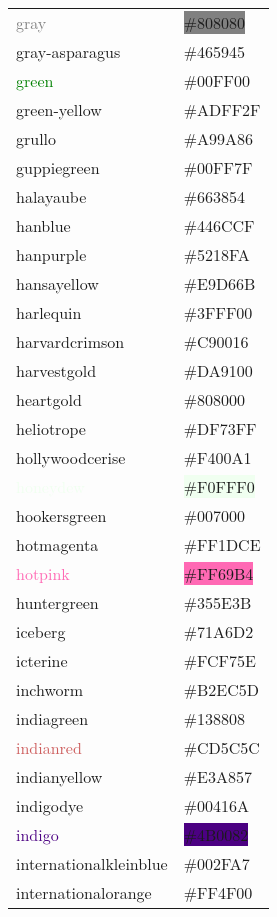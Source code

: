 \documentclass[
]{article}
\begin{document}
\begin{longtable}[]{@{}ll@{}}
\textcolor{gray}{gray} & \colorbox{gray}{\#808080}\tabularnewline
\textcolor{gray-asparagus}{gray-asparagus} &
\colorbox{gray-asparagus}{\#465945}\tabularnewline
\textcolor{green}{green} &
\colorbox{electricgreen}{\#00FF00}\tabularnewline
\textcolor{green-yellow}{green-yellow} &
\colorbox{green-yellow}{\#ADFF2F}\tabularnewline
\textcolor{grullo}{grullo} & \colorbox{grullo}{\#A99A86}\tabularnewline
\textcolor{guppiegreen}{guppiegreen} &
\colorbox{guppiegreen}{\#00FF7F}\tabularnewline
\textcolor{halayaube}{halayaube} &
\colorbox{halayaube}{\#663854}\tabularnewline
\textcolor{hanblue}{hanblue} &
\colorbox{hanblue}{\#446CCF}\tabularnewline
\textcolor{hanpurple}{hanpurple} &
\colorbox{hanpurple}{\#5218FA}\tabularnewline
\textcolor{hansayellow}{hansayellow} &
\colorbox{arylideyellow}{\#E9D66B}\tabularnewline
\textcolor{harlequin}{harlequin} &
\colorbox{harlequin}{\#3FFF00}\tabularnewline
\textcolor{harvardcrimson}{harvardcrimson} &
\colorbox{harvardcrimson}{\#C90016}\tabularnewline
\textcolor{harvestgold}{harvestgold} &
\colorbox{harvestgold}{\#DA9100}\tabularnewline
\textcolor{heartgold}{heartgold} &
\colorbox{heartgold}{\#808000}\tabularnewline
\textcolor{heliotrope}{heliotrope} &
\colorbox{heliotrope}{\#DF73FF}\tabularnewline
\textcolor{hollywoodcerise}{hollywoodcerise} &
\colorbox{fashionfuchsia}{\#F400A1}\tabularnewline
\textcolor{honeydew}{honeydew} &
\colorbox{honeydew}{\#F0FFF0}\tabularnewline
\textcolor{hookersgreen}{hookersgreen} &
\colorbox{hookersgreen}{\#007000}\tabularnewline
\textcolor{hotmagenta}{hotmagenta} &
\colorbox{hotmagenta}{\#FF1DCE}\tabularnewline
\textcolor{hotpink}{hotpink} &
\colorbox{hotpink}{\#FF69B4}\tabularnewline
\textcolor{huntergreen}{huntergreen} &
\colorbox{huntergreen}{\#355E3B}\tabularnewline
\textcolor{iceberg}{iceberg} &
\colorbox{iceberg}{\#71A6D2}\tabularnewline
\textcolor{icterine}{icterine} &
\colorbox{icterine}{\#FCF75E}\tabularnewline
\textcolor{inchworm}{inchworm} &
\colorbox{inchworm}{\#B2EC5D}\tabularnewline
\textcolor{indiagreen}{indiagreen} &
\colorbox{indiagreen}{\#138808}\tabularnewline
\textcolor{indianred}{indianred} &
\colorbox{chestnut}{\#CD5C5C}\tabularnewline
\textcolor{indianyellow}{indianyellow} &
\colorbox{indianyellow}{\#E3A857}\tabularnewline
\textcolor{indigodye}{indigodye} &
\colorbox{indigodye}{\#00416A}\tabularnewline
\textcolor{indigo}{indigo} & \colorbox{indigo}{\#4B0082}\tabularnewline
\textcolor{internationalkleinblue}{internationalkleinblue} &
\colorbox{internationalkleinblue}{\#002FA7}\tabularnewline
\textcolor{internationalorange}{internationalorange} &
\colorbox{internationalorange}{\#FF4F00}\tabularnewline

\end{longtable}
\end{document}
